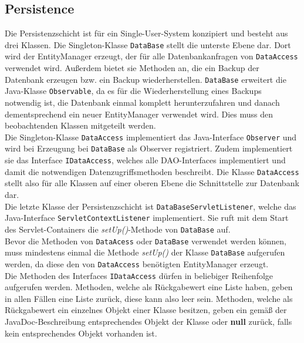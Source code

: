 \documentclass[fontsize=12pt,paper=a4,twoside]{scrartcl}
\begin{document}
\subsection{Persistence}
\label{subsec:persistence}

Die Persistenzschicht ist für ein Single-User-System konzipiert und besteht aus drei Klassen. Die Singleton-Klasse \texttt{DataBase} stellt die unterste Ebene dar. Dort wird der EntityManager erzeugt, der für alle Datenbankanfragen von \texttt{DataAccess} verwendet wird. Außerdem bietet sie Methoden an, die ein Backup der Datenbank erzeugen bzw. ein Backup wiederherstellen. \texttt{DataBase} erweitert die Java-Klasse \texttt{Observable}, da es für die Wiederherstellung eines Backups notwendig ist, die Datenbank einmal komplett herunterzufahren und danach dementsprechend ein neuer EntityManager verwendet wird. Dies muss den beobachtenden Klassen mitgeteilt werden.\\
Die Singleton-Klasse \texttt{DataAccess} implementiert das Java-Interface \texttt{Observer} und wird bei Erzeugung bei \texttt{DataBase} als Observer registriert. Zudem implementiert sie das Interface \texttt{IDataAccess}, welches alle DAO-Interfaces implementiert und damit die notwendigen Datenzugriffsmethoden beschreibt. Die Klasse \texttt{DataAccess} stellt also für alle Klassen auf einer oberen Ebene die Schnittstelle zur Datenbank dar.\\
Die letzte Klasse der Persistenzschicht ist \texttt{DataBaseServletListener}, welche das Java-Interface \texttt{ServletContextListener} implementiert. Sie ruft mit dem Start des Servlet-Containers die \textit{setUp()}-Methode von \texttt{DataBase} auf.\\

Bevor die Methoden von \texttt{DataAcess} oder \texttt{DataBase} verwendet werden können, muss mindestens einmal die Methode \textit{setUp()} der Klasse \texttt{DataBase} aufgerufen werden, da diese den von \texttt{DataAccess} benötigten EntityManager erzeugt.\\
Die Methoden des Interfaces \texttt{IDataAccess} dürfen in beliebiger Reihenfolge aufgerufen werden. Methoden, welche als Rückgabewert eine Liste haben, geben in allen Fällen eine Liste zurück, diese kann also leer sein. Methoden, welche als Rückgabewert ein einzelnes Objekt einer Klasse besitzen, geben ein gemäß der JavaDoc-Beschreibung entsprechendes Objekt der Klasse oder \textbf{null} zurück, falls kein entsprechendes Objekt vorhanden ist. 



\end{document}
